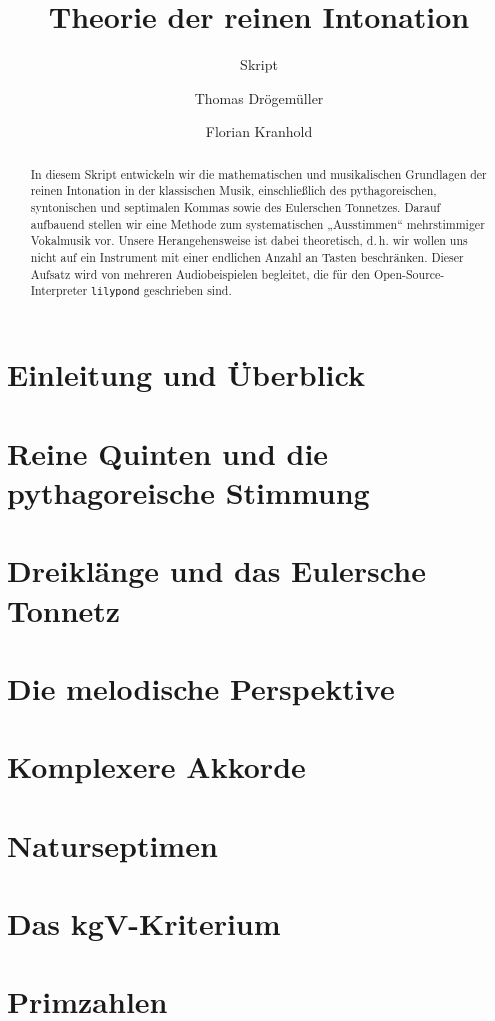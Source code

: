\documentclass[ngerman,11pt]{scrartcl}
\title     {Theorie der reinen Intonation}
\author    {Thomas Drögemüller\and Florian Kranhold}
\subtitle  {Skript}
\begin{document}
\maketitle

\begin{abstract}
  In diesem Skript entwickeln wir die mathematischen und musikalischen
  Grundlagen der reinen Intonation in der klassischen Musik, einschließlich des
  pythagoreischen, syntonischen und septimalen Kommas sowie des Eulerschen
  Tonnetzes. Darauf aufbauend stellen wir eine Methode zum systematischen
  „Ausstimmen“ mehrstimmiger Vokalmusik vor. Unsere Herangehensweise ist dabei
  theoretisch, d.\,h. wir wollen uns nicht auf ein Instrument mit einer
  endlichen Anzahl an Tasten beschränken. Dieser Aufsatz wird von mehreren
  Audiobeispielen begleitet, die für den Open-Source-Interpreter
  \texttt{lilypond} geschrieben sind.
\end{abstract}

\section{Einleitung und Überblick}
\label{sec:int}


\section{Reine Quinten und die pythagoreische Stimmung}
\label{sec:pyth}


\section{Dreiklänge und das Eulersche Tonnetz}
\label{sec:tri}


\section{Die melodische Perspektive}
\label{sec:melody}


\section{Komplexere Akkorde}
\label{sec:quad}


\section{Naturseptimen}
\label{sec:sept}


\appendix
\section{Das kgV-Kriterium}
\label{sec:kgv}


\section{Primzahlen}
\label{sec:primes}



\printbibliography[heading=bibintoc]
\end{document}
